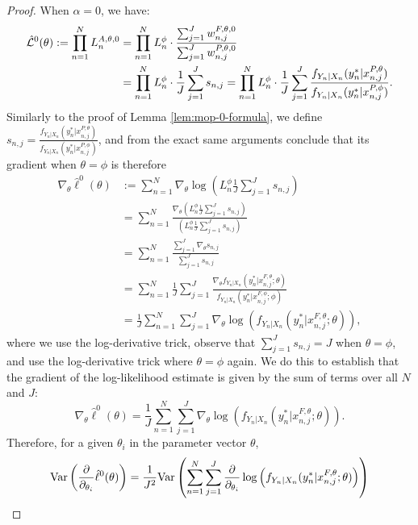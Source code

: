 \begin{proof}
When $\alpha=0$, we have:
\begin{align}
    \hat{\mathcal{L}}^0(\theta) := \prod_{n=1}^N L_n^{A, \theta, 0} &= \prod_{n=1}^N L_n^\phi \cdot \frac{\sum_{j=1}^J w_{n,j}^{F,\theta,0}}{\sum_{j=1}^J w_{n,j}^{P,\theta,0}} 
    \\&
    = \prod_{n=1}^N L_n^\phi \cdot \frac{1}{J}\sum_{j=1}^J s_{n,j} = \prod_{n=1}^N L_n^\phi \cdot \frac{1}{J}\sum_{j=1}^J \frac{f_{Y_n|X_n}(y_n^*|x_{n,j}^{P, \theta})}{f_{Y_n|X_n}(y_n^*|x_{n,j}^{P, \phi})}.
\end{align}
Similarly to the proof of Lemma \ref{lem:mop-0-formula}, we define $s_{n,j}=\frac{f_{Y_n|X_n}(y_n^*|x_{n,j}^{P, \theta})}{f_{Y_n|X_n}(y_n^*|x_{n,j}^{P, \phi})}$, and from the exact same arguments conclude that its gradient when $\theta=\phi$ is therefore 
\begin{align}
    \nabla_\theta \hat{\ell}^0(\theta) &:= \sum_{n=1}^N \nabla_\theta \log\left(L_n^\phi \frac{1}{J} \sum_{j=1}^J s_{n,j}\right) \\
    &= \sum_{n=1}^N \frac{\nabla_\theta \left(L_n^\phi \frac{1}{J} \sum_{j=1}^J s_{n,j}\right)}{\left(L_n^\phi \frac{1}{J} \sum_{j=1}^J s_{n,j}\right)} \\
    &= \sum_{n=1}^N \frac{\sum_{j=1}^J \nabla_\theta s_{n,j}}{\sum_{j=1}^J s_{n,j}} \\
    &= \sum_{n=1}^N \frac{1}{J} \sum_{j=1}^J \frac{\nabla_\theta f_{Y_n|X_{n}}(y_n^*|x_{n,j}^{F, \theta}; \theta)}{f_{Y_n|X_{n}}(y_n^*|x_{n,j}^{F, \phi}; \phi)} \\
    &= \frac{1}{J} \sum_{n=1}^N \sum_{j=1}^J \nabla_\theta \log\left(f_{Y_n|X_{n}}(y_n^*|x_{n,j}^{F, \theta}; \theta)\right),
\end{align}
where we use the log-derivative trick, observe that $\sum_{j=1}^J s_{n,j} = J$ when $\theta=\phi$, and use the log-derivative trick where $\theta=\phi$ again. We do this to establish that the gradient of the log-likelihood estimate is given by the sum of terms over all $N$ and $J$:
\begin{equation}
\nabla_\theta \hat{\ell}^0(\theta) = \frac{1}{J} \sum_{n=1}^N \sum_{j=1}^J \nabla_\theta \log\left(f_{Y_n|X_{n}}(y_n^*|x_{n,j}^{F, \theta}; \theta)\right).
\end{equation}
Therefore, for a given $\theta_i$ in the parameter vector $\theta$,
\begin{align}
    \Var\left(\frac{\partial}{\partial_{\theta_i}} \hat\ell^0(\theta)\right) &= \frac{1}{J^2}\Var\left(\sum_{n=1}^N\sum_{j=1}^{J}\frac{\partial}{\partial_{\theta_i}} \log\left(f_{Y_n|X_{n}}(y_n^*|x_{n,j}^{F, \theta}; \theta)\right)\right) \\

\end{align}
\end{proof}
